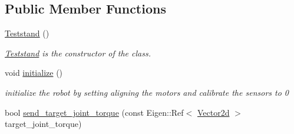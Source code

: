 \subsection*{Public Member Functions}
\begin{DoxyCompactItemize}
\item 
\hyperlink{classblmc__robots_1_1Teststand_a4747b0754cd3dd669c02f27662baef7e}{Teststand} ()
\begin{DoxyCompactList}\small\item\em \hyperlink{classblmc__robots_1_1Teststand}{Teststand} is the constructor of the class. \end{DoxyCompactList}\item 
void \hyperlink{classblmc__robots_1_1Teststand_aa41ad951a8259fd15e6309e850a6084a}{initialize} ()\hypertarget{classblmc__robots_1_1Teststand_aa41ad951a8259fd15e6309e850a6084a}{}\label{classblmc__robots_1_1Teststand_aa41ad951a8259fd15e6309e850a6084a}

\begin{DoxyCompactList}\small\item\em initialize the robot by setting aligning the motors and calibrate the sensors to 0 \end{DoxyCompactList}\item 
bool \hyperlink{classblmc__robots_1_1Teststand_aabb484d65bca5a341dd24abd91c47b9b}{send\+\_\+target\+\_\+joint\+\_\+torque} (const Eigen\+::\+Ref$<$ \hyperlink{common__header_8hpp_acb6916bc8c9fe9d98c484fd4cc201447}{Vector2d} $>$ target\+\_\+joint\+\_\+torque)\hypertarget{classblmc__robots_1_1Teststand_aabb484d65bca5a341dd24abd91c47b9b}{}\label{classblmc__robots_1_1Teststand_aabb484d65bca5a341dd24abd91c47b9b}


\end{DoxyCompactItemize}
